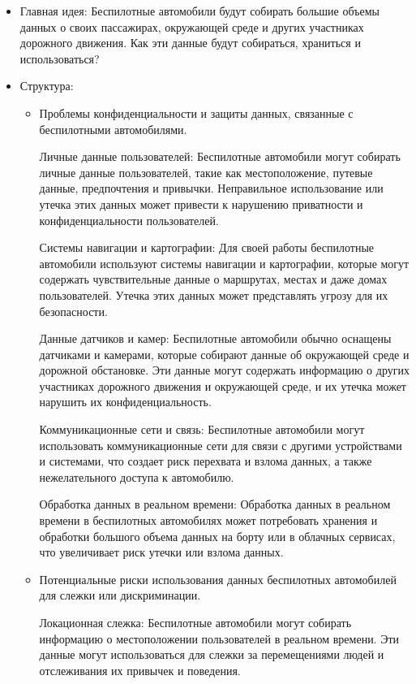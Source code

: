 \documentclass{article}
\begin{document}
\begin{itemize}
    \item Главная идея: Беспилотные автомобили будут собирать большие объемы данных о своих пассажирах, окружающей среде и других участниках дорожного движения. Как эти данные будут собираться, храниться и использоваться?
    
    \item Структура:
    \begin{itemize}
        \item Проблемы конфиденциальности и защиты данных, связанные с беспилотными автомобилями.

        Личные данные пользователей: Беспилотные автомобили могут собирать личные данные пользователей, такие как местоположение, путевые данные, предпочтения и привычки. Неправильное использование или утечка этих данных может привести к нарушению приватности и конфиденциальности пользователей.

        Системы навигации и картографии: Для своей работы беспилотные автомобили используют системы навигации и картографии, которые могут содержать чувствительные данные о маршрутах, местах и даже домах пользователей. Утечка этих данных может представлять угрозу для их безопасности.

        Данные датчиков и камер: Беспилотные автомобили обычно оснащены датчиками и камерами, которые собирают данные об окружающей среде и дорожной обстановке. Эти данные могут содержать информацию о других участниках дорожного движения и окружающей среде, и их утечка может нарушить их конфиденциальность.

        Коммуникационные сети и связь: Беспилотные автомобили могут использовать коммуникационные сети для связи с другими устройствами и системами, что создает риск перехвата и взлома данных, а также нежелательного доступа к автомобилю.

        Обработка данных в реальном времени: Обработка данных в реальном времени в беспилотных автомобилях может потребовать хранения и обработки большого объема данных на борту или в облачных сервисах, что увеличивает риск утечки или взлома данных.

        
        \item Потенциальные риски использования данных беспилотных автомобилей для слежки или дискриминации.

        Локационная слежка: Беспилотные автомобили могут собирать информацию о местоположении пользователей в реальном времени. Эти данные могут использоваться для слежки за перемещениями людей и отслеживания их привычек и поведения.


\end{itemize}
\end{itemize}
\end{document}
